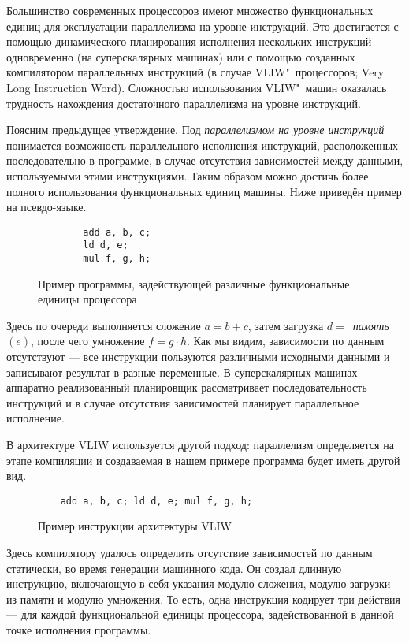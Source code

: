 Большинство современных процессоров имеют множество функциональных единиц для эксплуатации параллелизма на уровне инструкций. Это достигается с помощью динамического планирования исполнения нескольких инструкций одновременно \cite{dynamic-scheduling} (на суперскалярных машинах) или с помощью созданных компилятором параллельных инструкций \cite{vliw} (в случае VLIW"~процессоров; Very Long Instruction Word). Сложностью использования VLIW"~машин оказалась трудность нахождения достаточного параллелизма на уровне инструкций.

Поясним предыдущее утверждение. Под \emph{параллелизмом на уровне инструкций} понимается возможность параллельного исполнения инструкций, расположенных последовательно в программе, в случае отсутствия зависимостей между данными, используемыми этими инструкциями. Таким образом можно достичь более полного использования функциональных единиц машины. Ниже приведён пример на псевдо-языке.

\begin{figure}[H]
    \begin{verbatim}
        add a, b, c;
        ld d, e; 
        mul f, g, h;
    \end{verbatim}
    \caption{Пример программы, задействующей различные функциональные единицы процессора}
    \label{fig:ilp}
\end{figure}

Здесь по очереди выполняется сложение $a = b + c$, затем загрузка $d = $~\emph{память}~$(e)$, после чего умножение $f = g \cdot h$. Как мы видим, зависимости по данным отсутствуют --- все инструкции пользуются различными исходными данными и записывают результат в разные переменные. В суперскалярных машинах аппаратно реализованный планировщик рассматривает последовательность инструкций и в случае отсутствия зависимостей планирует параллельное исполнение.

В архитектуре VLIW используется другой подход: параллелизм определяется на этапе компиляции и создаваемая в нашем примере программа будет иметь другой вид.

\begin{figure}[H]
    \begin{verbatim}
    add a, b, c; ld d, e; mul f, g, h;
    \end{verbatim}
    \caption{Пример инструкции архитектуры VLIW}
    \label{fig:vliw}
\end{figure}

Здесь компилятору удалось определить отсутствие зависимостей по данным статически, во время генерации машинного кода. Он создал длинную инструкцию, включающую в себя указания модулю сложения, модулю загрузки из памяти и модулю умножения. То есть, одна инструкция кодирует три действия --- для каждой функциональной единицы процессора, задействованной в данной точке исполнения программы.

